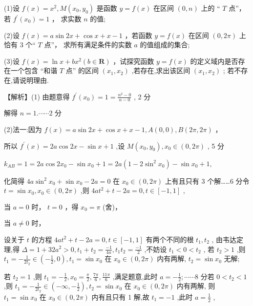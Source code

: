 \documentclass[10pt]{article}
\newcommand*\circled[1]{\tikz[baseline=(char.base)]{\node[shape=circle,draw,inner sep=1.5pt] (char) {\small #1};}}
\begin{document}
(1)设 \(f\left( x\right)  = {x}^{2},M\left( {{x}_{0},{y}_{0}}\right)\) 是函数 \(y = f\left( x\right)\) 在区间 \(\left( {0,n}\right)\) 上的 “ \(T\) 点”，若 \({f}^{\prime }\left( {x}_{0}\right)  = 1\) ， 求实数 \(n\) 的值;

(2)设 \(f\left( x\right)  = a\sin {2x} + \cos x + x - 1\) ，若函数 \(y = f\left( x\right)\) 在区间 \(\left( {0,{2\pi }}\right)\) 上恰有 3 个“ \(T\) 点”， 求所有满足条件的实数 \(a\) 的值组成的集合;

(3)设 \(f\left( x\right)  = \ln x + b{x}^{2}\left( {b \in  \mathbf{R}}\right)\) ，试探究函数 \(y = f\left( x\right)\) 的定义域内是否存在一个包含 “和谐 \(T\) 点” 的区间 \(\left( {{x}_{1},{x}_{2}}\right)\) ,若存在,求出该区间 \(\left( {{x}_{1},{x}_{2}}\right)\) ; 若不存在,请说明理由.

【解析】(1) 由题意得 \({f}^{\prime }\left( {x}_{0}\right)  = 1 = \frac{{n}^{2} - 0}{n - 0}\) , 2 分

解得 \(n = 1.\cdots \cdots 2\) 分

(2)法一:因为 \(f\left( x\right)  = a\sin {2x} + \cos x + x - 1,A\left( {0,0}\right) ,B\left( {{2\pi },{2\pi }}\right)\) ，

所以 \({f}^{\prime }\left( x\right)  = {2a}\cos {2x} - \sin x + 1\) ,设 \(M\left( {{x}_{0},{y}_{0}}\right) ,{x}_{0} \in  \left( {0,{2\pi }}\right)\) , 5 分

\({k}_{AB} = 1 = {2a}\cos 2{x}_{0} - \sin {x}_{0} + 1 = {2a}\left( {1 - 2{\sin }^{2}{x}_{0}}\right)  - \sin {x}_{0} + 1,\)

化简得 \({4a}{\sin }^{2}{x}_{0} + \sin {x}_{0} - {2a} = 0\) 在 \({x}_{0} \in  \left( {0,{2\pi }}\right)\) 上有且只有 3 个解……6 分令 \(t = \sin {x}_{0},{x}_{0} \in  \left( {0,{2\pi }}\right)\) ,则 \({4a}{t}^{2} + t - {2a} = 0,t \in  \left\lbrack  {-1,1}\right\rbrack\) ,

 \circled{1}  当 \(a = 0\) 时， \(t = 0\) ，得 \({x}_{0} = \pi\) (舍)，

 \circled{2} 当 \(a \neq  0\) 时，

设关于 \(t\) 的方程 \({4a}{t}^{2} + t - {2a} = 0,t \in  \left\lbrack  {-1,1}\right\rbrack\) 有两个不同的根 \({t}_{1},{t}_{2}\) , 由韦达定理,得 \(\Delta  = 1 + {32}{a}^{2} > 0,{t}_{1} + {t}_{2} = \frac{-1}{4a},{t}_{1}{t}_{2} = \frac{-1}{2}\) ,不妨设 \({t}_{1} < 0 < {t}_{2}\) , 若 \({t}_{2} > 1\) ,则 \({t}_{1} =  - \frac{1}{2{t}_{2}} \in  \left( {-\frac{1}{2},0}\right) ,{t}_{1} = \sin {x}_{0}\) 在 \({x}_{0} \in  \left( {0,{2\pi }}\right)\) 内有两解, \({t}_{2} = \sin {x}_{0}\) 无解;

若 \({t}_{2} = 1\) ,则 \({t}_{1} =  - \frac{1}{2},{x}_{0} = \frac{\pi }{2},\frac{7\pi }{6},\frac{11\pi }{6}\) ,满足题意,此时 \(a =  - \frac{1}{2};\cdots \cdots 8\) 分若 \(0 < {t}_{2} < 1\) ,则 \({t}_{1} =  - \frac{1}{2{t}_{2}} \in  \left( {-\infty , - \frac{1}{2}}\right) ,{t}_{2} = \sin {x}_{0}\) 在 \({x}_{0} \in  \left( {0,{2\pi }}\right)\) 内有两解, 则 \({t}_{1} = \sin {x}_{0}\) 在 \({x}_{0} \in  \left( {0,{2\pi }}\right)\) 内有且只有 1 解,故 \({t}_{1} =  - 1\) ,此时 \(a = \frac{1}{2}\) ,
\end{document}
